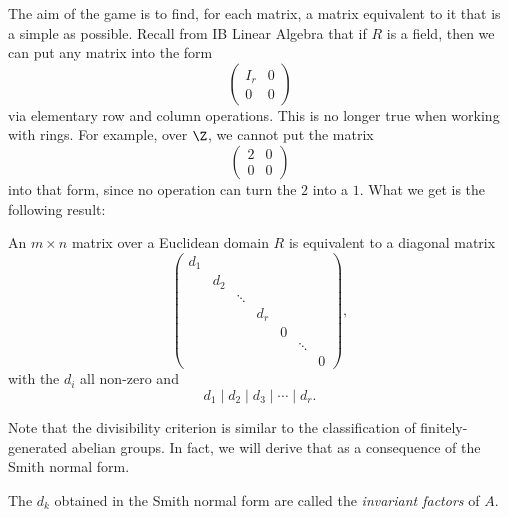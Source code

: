 \documentclass[a4paper]{article}
\begin{document}
The aim of the game is to find, for each matrix, a matrix equivalent to it that is a simple as possible. Recall from IB Linear Algebra that if $R$ is a field, then we can put any matrix into the form
\[
  \begin{pmatrix}
    I_r & 0\\
    0 & 0
  \end{pmatrix}
\]
via elementary row and column operations. This is no longer true when working with rings. For example, over $\Z$, we cannot put the matrix
\[
  \begin{pmatrix}
    2 & 0\\
    0 & 0
  \end{pmatrix}
\]
into that form, since no operation can turn the $2$ into a $1$. What we get is the following result:
\begin{thm}
  An $m \times n$ matrix over a Euclidean domain $R$ is equivalent to a diagonal matrix
  \[
    \begin{pmatrix}
      d_1\\
      & d_2\\
      & & \ddots\\
      & & & d_r\\
      & & & & 0\\
      & & & & & \ddots\\
      & & & & & & 0
    \end{pmatrix},
  \]
  with the $d_i$ all non-zero and
  \[
    d_1 \mid d_2 \mid d_3 \mid \cdots \mid d_r.
  \]
\end{thm}
Note that the divisibility criterion is similar to the classification of finitely-generated abelian groups. In fact, we will derive that as a consequence of the Smith normal form.

\begin{defi}
  The $d_k$ obtained in the Smith normal form are called the \emph{invariant factors} of $A$.
\end{defi}
\end{document}
